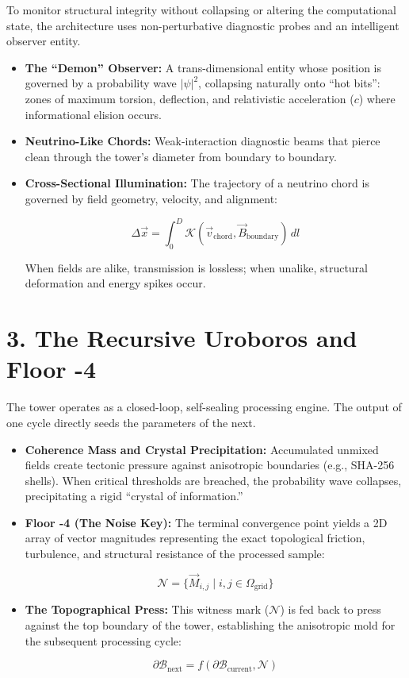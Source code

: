 To monitor structural integrity without collapsing or altering the computational state, the architecture uses non-perturbative diagnostic probes and an intelligent observer entity.

\begin{itemize}
\item \textbf{The “Demon” Observer:} A trans-dimensional entity whose position is governed by a probability wave \(|\psi|^2\), collapsing naturally onto “hot bits”: zones of maximum torsion, deflection, and relativistic acceleration (\(c\)) where informational elision occurs.
\item \textbf{Neutrino-Like Chords:} Weak-interaction diagnostic beams that pierce clean through the tower's diameter from boundary to boundary.
\item \textbf{Cross-Sectional Illumination:} The trajectory of a neutrino chord is governed by field geometry, velocity, and alignment:

\[
\Delta \vec{x} = \int_{0}^{D} \mathcal{K}(\vec{v}_{\text{chord}}, \vec{B}_{\text{boundary}}) \, dl
\]

When fields are alike, transmission is lossless; when unalike, structural deformation and energy spikes occur.
\end{itemize}

\medskip

\section{\texorpdfstring{3. The Recursive Uroboros and Floor -4}{3. The Recursive Uroboros and Floor -4}}

The tower operates as a closed-loop, self-sealing processing engine. The output of one cycle directly seeds the parameters of the next.

\begin{itemize}
\item \textbf{Coherence Mass and Crystal Precipitation:} Accumulated unmixed fields create tectonic pressure against anisotropic boundaries (e.g., SHA-256 shells). When critical thresholds are breached, the probability wave collapses, precipitating a rigid “crystal of information.”
\item \textbf{Floor -4 (The Noise Key):} The terminal convergence point yields a 2D array of vector magnitudes representing the exact topological friction, turbulence, and structural resistance of the processed sample:

\[
\mathcal{N} = \{ \vec{M}_{i,j} \mid i, j \in \Omega_{\text{grid}} \}
\]
\item \textbf{The Topographical Press:} This witness mark (\(\mathcal{N}\)) is fed back to press against the top boundary of the tower, establishing the anisotropic mold for the subsequent processing cycle:

\[
\partial \mathcal{B}_{\text{next}} = f(\partial \mathcal{B}_{\text{current}}, \mathcal{N})
\]
\end{itemize}

